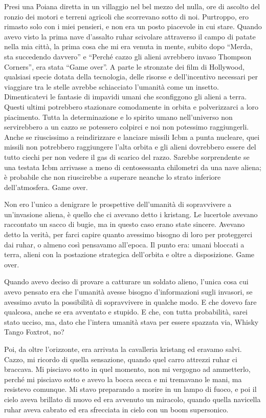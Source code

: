 Presi una Poiana diretta in un villaggio nel bel mezzo del nulla, ore di
ascolto del ronzio dei motori e terreni agricoli che scorrevano sotto di
noi. Purtroppo, ero rimasto solo con i miei pensieri, e non era un posto
piacevole in cui stare. Quando avevo visto la prima nave d'assalto ruhar
scivolare attraverso il campo di patate nella mia città, la prima cosa
che mi era venuta in mente, subito dopo ``Merda, sta succedendo
davvero'' e ``Perché cazzo gli alieni avrebbero invaso Thompson
Corners'', era stata ``Game over''. A parte le stronzate dei film di
Hollywood, qualsiasi specie dotata della tecnologia, delle risorse e
dell'incentivo necessari per viaggiare tra le stelle avrebbe schiacciato
l'umanità come un insetto. Dimenticatevi le fantasie di impavidi umani
che sconfiggono gli alieni a terra. Questi ultimi potrebbero stazionare
comodamente in orbita e polverizzarci a loro piacimento. Tutta la
determinazione e lo spirito umano nell'universo non servirebbero a un
cazzo se potessero colpirci e noi non potessimo raggiungerli. Anche se
riuscissimo a reindirizzare e lanciare missili Icbm a punta nucleare,
quei missili non potrebbero raggiungere l'alta orbita e gli alieni
dovrebbero essere del tutto ciechi per non vedere il gas di scarico del
razzo. Sarebbe sorprendente se una testata Icbm arrivasse a meno di
centosessanta chilometri da una nave aliena; è probabile che non
riuscirebbe a superare neanche lo strato inferiore dell'atmosfera. Game
over.

Non ero l'unico a denigrare le prospettive dell'umanità di sopravvivere
a un'invasione aliena, è quello che ci avevano detto i kristang. Le
lucertole avevano raccontato un sacco di bugie, ma in questo caso erano
state sincere. Avevano detto la verità, per farci capire quanto avessimo
bisogno di loro per proteggerci dai ruhar, o almeno così pensavamo
all'epoca. Il punto era: umani bloccati a terra, alieni con la
postazione strategica dell'orbita e oltre a disposizione. Game over.

Quando avevo deciso di provare a catturare un soldato alieno, l'unica
cosa cui avevo pensato era che l'umanità avesse bisogno d'informazioni
sugli invasori, se avessimo avuto la possibilità di sopravvivere in
qualche modo. E che dovevo fare qualcosa, anche se era avventato e
stupido. E che, con tutta probabilità, sarei stato ucciso, ma, dato che
l'intera umanità stava per essere spazzata via, Whisky Tango Foxtrot,
no?

Poi, da oltre l'orizzonte, era arrivata la cavalleria kristang ed
eravamo salvi. Cazzo, mi ricordo di quella sensazione, quando quel carro
attrezzi ruhar ci braccava. Mi pisciavo sotto in quel momento, non mi
vergogno ad ammetterlo, perché mi pisciavo sotto e avevo la bocca secca
e mi tremavano le mani, ma resistevo comunque. Mi stavo preparando a
morire in un lampo di fuoco, e poi il cielo aveva brillato di nuovo ed
era avvenuto un miracolo, quando quella navicella ruhar aveva cabrato ed
era sfrecciata in cielo con un boom supersonico.

